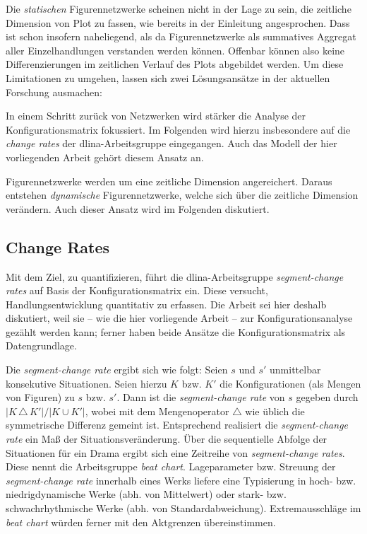 \documentclass[a4paper,10pt,abstract=true,headings=small]{scrartcl}
\newcommand{\eng}[1]{\textenglish{\emph{#1}}}
\begin{document}
Die \emph{statischen} Figurennetzwerke scheinen nicht in der Lage zu sein, die zeitliche Dimension von Plot zu fassen, wie bereits in der Einleitung angesprochen.
Dass ist schon insofern naheliegend, als da Figurennetzwerke als summatives Aggregat aller Einzelhandlungen verstanden werden können.
Offenbar können also keine Differenzierungen im zeitlichen Verlauf des Plots abgebildet werden.
Um diese Limitationen zu umgehen, lassen sich zwei Lösungsansätze in der aktuellen Forschung ausmachen:
\begin{enumerate*}
    \item In einem Schritt zurück von Netzwerken wird stärker die Analyse der Konfigurationsmatrix fokussiert.
        Im Folgenden wird hierzu insbesondere auf die \eng{change rates} der dlina-Arbeitsgruppe eingegangen.
        Auch das Modell der hier vorliegenden Arbeit gehört diesem Ansatz an.
    \item Figurennetzwerke werden um eine zeitliche Dimension angereichert.
        Daraus entstehen \emph{dynamische} Figurennetzwerke, welche sich über die zeitliche Dimension verändern.
        Auch dieser Ansatz wird im Folgenden diskutiert.
\end{enumerate*}

\subsection{Change Rates}

Mit dem Ziel,  zu quantifizieren, führt die dlina-Arbeitsgruppe \emph{segment-change rates} auf Basis der Konfigurationsmatrix ein.
Diese versucht, Handlungsentwicklung quantitativ zu erfassen.
Die Arbeit sei hier deshalb diskutiert, weil sie – wie die hier vorliegende Arbeit – zur Konfigurationsanalyse gezählt werden kann; ferner haben beide Ansätze die Konfigurationsmatrix als Datengrundlage.\autocites{trilcke_netzwerkdynamik_2017}{fischer_network_2017}{trilcke_small_2020}

Die \emph{segment-change rate} ergibt sich wie folgt:
Seien $s$ und $s'$ unmittelbar konsekutive Situationen.
Seien hierzu $K$ bzw. $K'$ die Konfigurationen (als Mengen von Figuren) zu $s$ bzw. $s'$.
Dann ist die \emph{segment-change rate} von $s$ gegeben durch $|K\,\triangle\,K'|/|K \cup K'|$, wobei mit dem Mengenoperator $\triangle$ wie üblich die symmetrische Differenz gemeint ist.
Entsprechend realisiert die \emph{segment-change rate} ein Maß der Situationsveränderung.
Über die sequentielle Abfolge der Situationen für ein Drama ergibt sich eine Zeitreihe von \emph{segment-change rates}.
Diese nennt die Arbeitsgruppe \emph{beat chart}.
Lageparameter bzw. Streuung der \emph{segment-change rate} innerhalb eines Werks liefere eine Typisierung in hoch- bzw. niedrigdynamische Werke (abh. von Mittelwert) oder stark- bzw. schwachrhythmische Werke (abh. von Standardabweichung). %
Extremausschläge im \emph{beat chart} würden ferner mit den Aktgrenzen übereinstimmen.\autocite[Vgl. z.\,B.][439--440]{fischer_network_2017}
\end{document}
